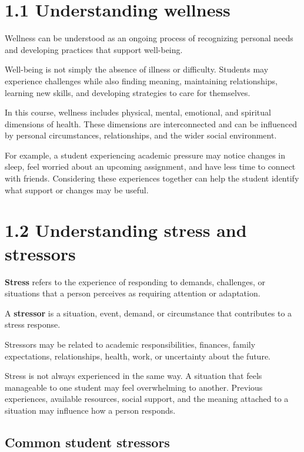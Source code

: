 \documentclass[
  letterpaper,
]{book}
\begin{document}
\section{1.1 Understanding wellness}\label{understanding-wellness}

Wellness can be understood as an ongoing process of recognizing personal
needs and developing practices that support well-being.

Well-being is not simply the absence of illness or difficulty. Students
may experience challenges while also finding meaning, maintaining
relationships, learning new skills, and developing strategies to care
for themselves.

In this course, wellness includes physical, mental, emotional, and
spiritual dimensions of health. These dimensions are interconnected and
can be influenced by personal circumstances, relationships, and the
wider social environment.

For example, a student experiencing academic pressure may notice changes
in sleep, feel worried about an upcoming assignment, and have less time
to connect with friends. Considering these experiences together can help
the student identify what support or changes may be useful.

\section{1.2 Understanding stress and
stressors}\label{understanding-stress-and-stressors}

\textbf{Stress} refers to the experience of responding to demands,
challenges, or situations that a person perceives as requiring attention
or adaptation.

A \textbf{stressor} is a situation, event, demand, or circumstance that
contributes to a stress response.

Stressors may be related to academic responsibilities, finances, family
expectations, relationships, health, work, or uncertainty about the
future.

Stress is not always experienced in the same way. A situation that feels
manageable to one student may feel overwhelming to another. Previous
experiences, available resources, social support, and the meaning
attached to a situation may influence how a person responds.

\subsection{Common student stressors}\label{common-student-stressors}
\end{document}

